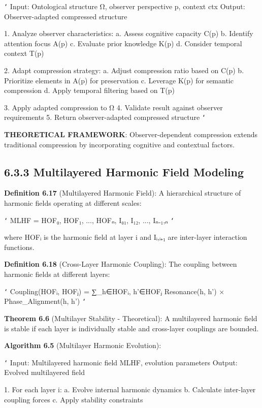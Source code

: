 \texttt{`}
Input: Ontological structure Ω, observer perspective p, context ctx
Output: Observer-adapted compressed structure

1. Analyze observer characteristics:
   a. Assess cognitive capacity C(p)
   b. Identify attention focus A(p)
   c. Evaluate prior knowledge K(p)
   d. Consider temporal context T(p)
   
2. Adapt compression strategy:
   a. Adjust compression ratio based on C(p)
   b. Prioritize elements in A(p) for preservation
   c. Leverage K(p) for semantic compression
   d. Apply temporal filtering based on T(p)
   
3. Apply adapted compression to Ω
4. Validate result against observer requirements
5. Return observer-adapted compressed structure
\texttt{`}

\textbf{THEORETICAL FRAMEWORK}: Observer-dependent compression extends traditional compression by incorporating cognitive and contextual factors.

\subsection{6.3.3 Multilayered Harmonic Field Modeling}

\textbf{Definition 6.17} (Multilayered Harmonic Field): A hierarchical structure of harmonic fields operating at different scales:

\texttt{`}
MLHF = {HOF₀, HOF₁, ..., HOFₙ, I₀₁, I₁₂, ..., Iₙ₋₁,ₙ}
\texttt{`}

where HOFᵢ is the harmonic field at layer i and Iᵢ,ᵢ₊₁ are inter-layer interaction functions.

\textbf{Definition 6.18} (Cross-Layer Harmonic Coupling): The coupling between harmonic fields at different layers:

\texttt{`}
Coupling(HOFᵢ, HOFⱼ) = ∑_{h∈HOFᵢ, h'∈HOFⱼ} Resonance(h, h') × Phase_Alignment(h, h')
\texttt{`}

\textbf{Theorem 6.6} (Multilayer Stability - Theoretical): A multilayered harmonic field is stable if each layer is individually stable and cross-layer couplings are bounded.

\textbf{Algorithm 6.5} (Multilayer Harmonic Evolution):

\texttt{`}
Input: Multilayered harmonic field MLHF, evolution parameters
Output: Evolved multilayered field

1. For each layer i:
   a. Evolve internal harmonic dynamics
   b. Calculate inter-layer coupling forces
   c. Apply stability constraints
   
